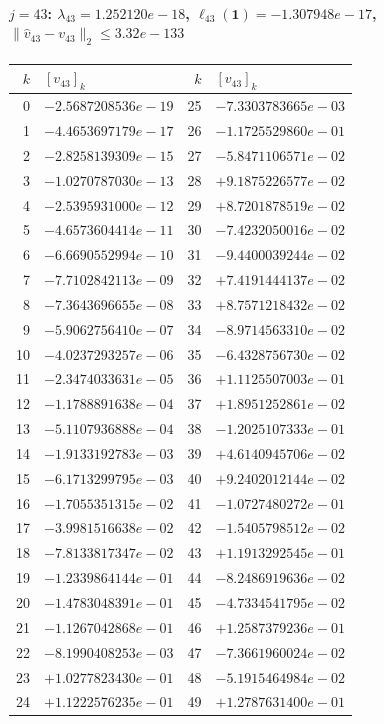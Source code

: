 \documentclass[11pt]{article}
\begin{document}
\paragraph{$j = 43$: $\lambda_{43} = 1.252120e-18$, \quad $\ell_{43}(\mathbf{1}) = -1.307948e-17$, \quad $\|\hat{v}_{43} - v_{43}\|_2 \leq 3.32e-133$}
\begin{center}
{\footnotesize
\begin{tabular}{r@{\;\;}l@{\quad}r@{\;\;}l}
\toprule
$k$ & $[v_{43}]_k$ & $k$ & $[v_{43}]_k$ \\
\midrule
0 & $-2.5687208536e-19$ & 25 & $-7.3303783665e-03$ \\
1 & $-4.4653697179e-17$ & 26 & $-1.1725529860e-01$ \\
2 & $-2.8258139309e-15$ & 27 & $-5.8471106571e-02$ \\
3 & $-1.0270787030e-13$ & 28 & $+9.1875226577e-02$ \\
4 & $-2.5395931000e-12$ & 29 & $+8.7201878519e-02$ \\
5 & $-4.6573604414e-11$ & 30 & $-7.4232050016e-02$ \\
6 & $-6.6690552994e-10$ & 31 & $-9.4400039244e-02$ \\
7 & $-7.7102842113e-09$ & 32 & $+7.4191444137e-02$ \\
8 & $-7.3643696655e-08$ & 33 & $+8.7571218432e-02$ \\
9 & $-5.9062756410e-07$ & 34 & $-8.9714563310e-02$ \\
10 & $-4.0237293257e-06$ & 35 & $-6.4328756730e-02$ \\
11 & $-2.3474033631e-05$ & 36 & $+1.1125507003e-01$ \\
12 & $-1.1788891638e-04$ & 37 & $+1.8951252861e-02$ \\
13 & $-5.1107936888e-04$ & 38 & $-1.2025107333e-01$ \\
14 & $-1.9133192783e-03$ & 39 & $+4.6140945706e-02$ \\
15 & $-6.1713299795e-03$ & 40 & $+9.2402012144e-02$ \\
16 & $-1.7055351315e-02$ & 41 & $-1.0727480272e-01$ \\
17 & $-3.9981516638e-02$ & 42 & $-1.5405798512e-02$ \\
18 & $-7.8133817347e-02$ & 43 & $+1.1913292545e-01$ \\
19 & $-1.2339864144e-01$ & 44 & $-8.2486919636e-02$ \\
20 & $-1.4783048391e-01$ & 45 & $-4.7334541795e-02$ \\
21 & $-1.1267042868e-01$ & 46 & $+1.2587379236e-01$ \\
22 & $-8.1990408253e-03$ & 47 & $-7.3661960024e-02$ \\
23 & $+1.0277823430e-01$ & 48 & $-5.1915464984e-02$ \\
24 & $+1.1222576235e-01$ & 49 & $+1.2787631400e-01$ \\
\bottomrule
\end{tabular}
}
\end{center}
\end{document}

